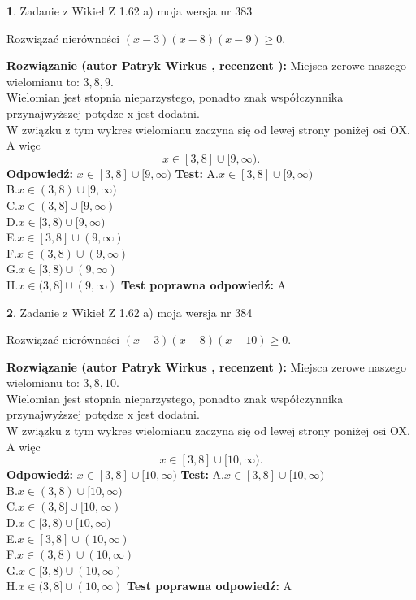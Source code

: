 \documentclass[12pt, a4paper]{article}
\theoremstyle{definition} %
\newtheorem{zad}{}
\newcommand{\zadStart}[1]{\begin{zad}#1\newline}
\newcommand{\zadStop}{\end{zad}}
\newcommand{\rozwStart}[2]{\noindent \textbf{Rozwiązanie (autor #1 , recenzent #2): }\newline}
\newcommand{\rozwStop}{\newline}
\newcommand{\odpStart}{\noindent \textbf{Odpowiedź:}\newline}
\newcommand{\odpStop}{\newline}
\newcommand{\testStart}{\noindent \textbf{Test:}\newline}
\newcommand{\testStop}{\newline}
\newcommand{\kluczStart}{\noindent \textbf{Test poprawna odpowiedź:}\newline}
\newcommand{\kluczStop}{\newline}
\begin{document}
\zadStart{Zadanie z Wikieł Z 1.62 a) moja wersja nr 383}

Rozwiązać nierówności $(x-3)(x-8)(x-9)\ge0$.
\zadStop
\rozwStart{Patryk Wirkus}{}
Miejsca zerowe naszego wielomianu to: $3, 8, 9$.\\
Wielomian jest stopnia nieparzystego, ponadto znak współczynnika przy\linebreak najwyższej potędze x jest dodatni.\\ W związku z tym wykres wielomianu zaczyna się od lewej strony poniżej osi OX. A więc $$x \in [3,8] \cup [9,\infty).$$
\rozwStop
\odpStart
$x \in [3,8] \cup [9,\infty)$
\odpStop
\testStart
A.$x \in [3,8] \cup [9,\infty)$\\
B.$x \in (3,8) \cup [9,\infty)$\\
C.$x \in (3,8] \cup [9,\infty)$\\
D.$x \in [3,8) \cup [9,\infty)$\\
E.$x \in [3,8] \cup (9,\infty)$\\
F.$x \in (3,8) \cup (9,\infty)$\\
G.$x \in [3,8) \cup (9,\infty)$\\
H.$x \in (3,8] \cup (9,\infty)$
\testStop
\kluczStart
A
\kluczStop



\zadStart{Zadanie z Wikieł Z 1.62 a) moja wersja nr 384}

Rozwiązać nierówności $(x-3)(x-8)(x-10)\ge0$.
\zadStop
\rozwStart{Patryk Wirkus}{}
Miejsca zerowe naszego wielomianu to: $3, 8, 10$.\\
Wielomian jest stopnia nieparzystego, ponadto znak współczynnika przy\linebreak najwyższej potędze x jest dodatni.\\ W związku z tym wykres wielomianu zaczyna się od lewej strony poniżej osi OX. A więc $$x \in [3,8] \cup [10,\infty).$$
\rozwStop
\odpStart
$x \in [3,8] \cup [10,\infty)$
\odpStop
\testStart
A.$x \in [3,8] \cup [10,\infty)$\\
B.$x \in (3,8) \cup [10,\infty)$\\
C.$x \in (3,8] \cup [10,\infty)$\\
D.$x \in [3,8) \cup [10,\infty)$\\
E.$x \in [3,8] \cup (10,\infty)$\\
F.$x \in (3,8) \cup (10,\infty)$\\
G.$x \in [3,8) \cup (10,\infty)$\\
H.$x \in (3,8] \cup (10,\infty)$
\testStop
\kluczStart
A
\kluczStop
\end{document}
